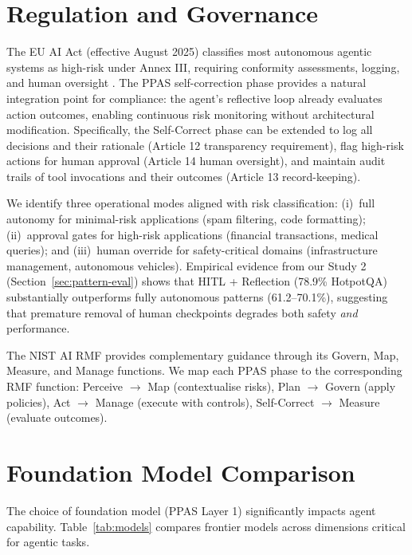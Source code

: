 \documentclass[review,authoryear]{elsarticle}
\theoremstyle{definition}
\begin{document}
\section{Regulation and Governance}\label{sec:governance}

The EU AI Act \citep{euaiact2024} (effective August 2025) classifies most autonomous agentic systems as high-risk under Annex III, requiring conformity assessments, logging, and human oversight \citep{smuha2021eu}. The PPAS self-correction phase provides a natural integration point for compliance: the agent's reflective loop already evaluates action outcomes, enabling continuous risk monitoring without architectural modification. Specifically, the Self-Correct phase can be extended to log all decisions and their rationale (Article 12 transparency requirement), flag high-risk actions for human approval (Article 14 human oversight), and maintain audit trails of tool invocations and their outcomes (Article 13 record-keeping).

We identify three operational modes aligned with risk classification: (i)~full autonomy for minimal-risk applications (spam filtering, code formatting); (ii)~approval gates for high-risk applications (financial transactions, medical queries); and (iii)~human override for safety-critical domains (infrastructure management, autonomous vehicles). Empirical evidence from our Study 2 (Section~\ref{sec:pattern-eval}) shows that HITL + Reflection (78.9\% HotpotQA) substantially outperforms fully autonomous patterns (61.2--70.1\%), suggesting that premature removal of human checkpoints degrades both safety \emph{and} performance.

The NIST AI RMF \citep{nist2023ai} provides complementary guidance through its Govern, Map, Measure, and Manage functions. We map each PPAS phase to the corresponding RMF function: Perceive $\rightarrow$ Map (contextualise risks), Plan $\rightarrow$ Govern (apply policies), Act $\rightarrow$ Manage (execute with controls), Self-Correct $\rightarrow$ Measure (evaluate outcomes).

\section{Foundation Model Comparison}\label{sec:models}

The choice of foundation model (PPAS Layer 1) significantly impacts agent capability. Table~\ref{tab:models} compares frontier models across dimensions critical for agentic tasks.
\end{document}
